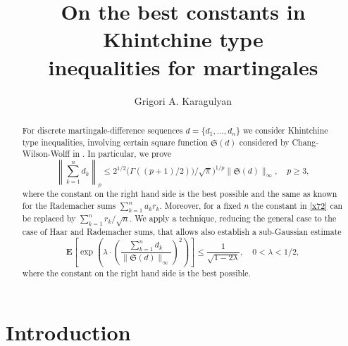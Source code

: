 \documentclass[12pt,reqno,fleqn]{amsart}
\title[] {On the best constants in Khintchine type \\inequalities for martingales}
\author{Grigori A. Karagulyan}
\theoremstyle{definition}
\theoremstyle{definition}
\theoremstyle{remark}
\def\ZS{\ensuremath{\mathfrak S}}
\def\ZE{\ensuremath{\mathbf E}}
\numberwithin{equation}{section}
\newcommand {\e }[1]{\eqref{#1}}
\begin{document}
	\begin{abstract}
		For discrete martingale-difference sequences $d=\{d_1,\ldots,d_n\}$ we consider Khintchine type inequalities, involving certain square function $\ZS(d)$ considered by Chang-Wilson-Wolff in \cite{CWW}. In particular, we prove
		\begin{equation}\label{x72}
			\left\|\sum_{k=1}^nd_k\right\|_p\le 2^{1/2}\big(\Gamma((p+1)/2))/\sqrt{\pi}\big)^{1/p}\|\ZS(d)\|_\infty,\quad p\ge 3,
		\end{equation}
		where the constant on the right hand side is the best possible and the same as known for the Rademacher sums $\sum_{k=1}^na_kr_k$. Moreover, for a fixed $n$ the constant in \e{x72} can be replaced by $\sum_{k=1}^nr_k/\sqrt{n}$. We apply a technique, reducing the general case to the case of Haar and Rademacher sums, that allows also establish a sub-Gaussian estimate
		\begin{equation}
			\ZE\left[\exp\left(\lambda\cdot \left(\frac{\sum_{k=1}^nd_k}{\|\ZS(d)\|_\infty}\right)^2\right)\right]\le \frac{1}{\sqrt{1-2\lambda}},\quad 0<\lambda<1/2,
		\end{equation} 
	where the constant on the right hand side is the best possible.
	\end{abstract}
	\maketitle  
	\section{Introduction}
\end{document}
